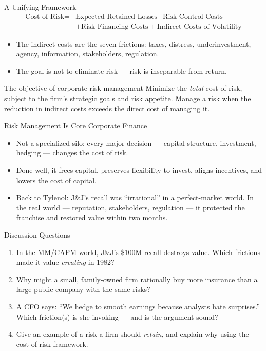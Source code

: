 \documentclass[11pt, aspectratio=169]{beamer}
\begin{document}
\begin{frame}{A Unifying Framework}
\[
\begin{aligned}
\text{Cost of Risk} ={}& \text{Expected Retained Losses} + \text{Risk Control Costs} \\
&+ \text{Risk Financing Costs} + \text{Indirect Costs of Volatility}
\end{aligned}
\]
\begin{itemize}
  \item The indirect costs are the seven frictions: taxes, distress, underinvestment, agency, information, stakeholders, regulation.
  \item The goal is \alert{not} to eliminate risk --- risk is inseparable from return.
\end{itemize}
\medskip
\begin{block}{The objective of corporate risk management}
Minimize the \emph{total} cost of risk, subject to the firm's strategic goals and risk appetite. Manage a risk when the reduction in indirect costs exceeds the direct cost of managing it.
\end{block}
\end{frame}

\begin{frame}{Risk Management Is Core Corporate Finance}
\begin{itemize}
  \item Not a specialized silo: every major decision --- capital structure, investment, hedging --- changes the cost of risk.
  \item Done well, it frees capital, preserves flexibility to invest, aligns incentives, and lowers the cost of capital.
  \item Back to Tylenol: J\&J's recall was ``irrational'' in a perfect-market world. In the real world --- reputation, stakeholders, regulation --- it protected the franchise and restored value within two months.
\end{itemize}
\end{frame}

\begin{frame}{Discussion Questions}
\begin{enumerate}
  \item In the MM/CAPM world, J\&J's \$100M recall destroys value. Which frictions made it value-\emph{creating} in 1982?
  \item Why might a small, family-owned firm rationally buy more insurance than a large public company with the same risks?
  \item A CFO says: ``We hedge to smooth earnings because analysts hate surprises.'' Which friction(s) is she invoking --- and is the argument sound?
  \item Give an example of a risk a firm should \emph{retain}, and explain why using the cost-of-risk framework.
\end{enumerate}
\end{frame}
\end{document}
